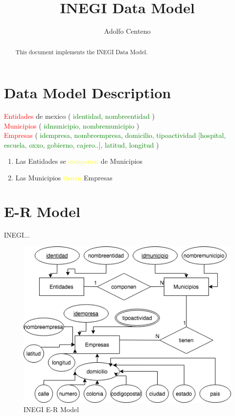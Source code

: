 \documentclass[10pt]{article}         %
\title{INEGI Data Model}
\author{Adolfo Centeno}
\begin{document}
\maketitle

\begin{abstract}
This document implements the INEGI Data Model.
\end{abstract}

\section{Data Model Description}


\textcolor{red}{Entidades} de mexico (\textcolor{green}{ identidad, nombreentidad } ) \\
\textcolor{red}{Municipios}  (\textcolor{green}{ idmunicipio, nombremunicipio} ) \\
\textcolor{red}{Empresas}  (\textcolor{green}{ idempresa, nombreempresa, domicilio, tipoactividad [hospital, escuela, oxxo, gobierno, cajero..], latitud, longitud } ) \\

\begin{enumerate}

\item
Las Entidades se \textcolor{yellow}{componen} de Municipios 
\item
Las Municipios  \textcolor{yellow}{tienen} Empresas 

\end{enumerate}


\section{E-R Model}

INEGI...

\begin{figure}[h]
     \includegraphics[scale=0.4]{er_inegi}
     \caption{INEGI E-R Model}
\end{figure}
   
\end{document}
